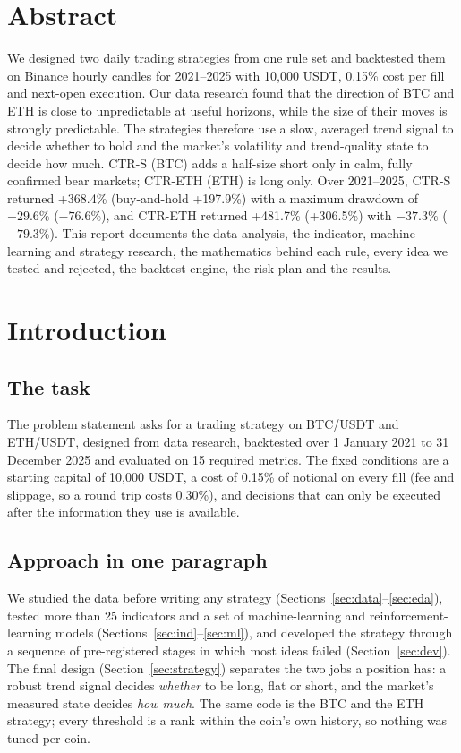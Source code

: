 \documentclass[11pt,a4paper]{article}
\theoremstyle{definition}
\begin{document}
\section*{Abstract}
We designed two daily trading strategies from one rule set and backtested them on Binance hourly candles for 2021--2025 with 10{,}000 USDT, 0.15\% cost per fill and next-open execution.
Our data research found that the direction of BTC and ETH is close to unpredictable at useful horizons, while the size of their moves is strongly predictable.
The strategies therefore use a slow, averaged trend signal to decide whether to hold and the market's volatility and trend-quality state to decide how much.
CTR-S (BTC) adds a half-size short only in calm, fully confirmed bear markets; CTR-ETH (ETH) is long only.
Over 2021--2025, CTR-S returned +368.4\% (buy-and-hold +197.9\%) with a maximum drawdown of $-29.6\%$ ($-76.6\%$), and CTR-ETH returned +481.7\% (+306.5\%) with $-37.3\%$ ($-79.3\%$).
This report documents the data analysis, the indicator, machine-learning and strategy research, the mathematics behind each rule, every idea we tested and rejected, the backtest engine, the risk plan and the results.

\vspace{4mm}
\tableofcontents
\newpage

\section{Introduction}
\subsection{The task}
The problem statement asks for a trading strategy on BTC/USDT and ETH/USDT, designed from data research, backtested over 1 January 2021 to 31 December 2025 and evaluated on 15 required metrics.
The fixed conditions are a starting capital of 10{,}000 USDT, a cost of 0.15\% of notional on every fill (fee and slippage, so a round trip costs 0.30\%), and decisions that can only be executed after the information they use is available.

\subsection{Approach in one paragraph}
We studied the data before writing any strategy (Sections~\ref{sec:data}--\ref{sec:eda}), tested more than 25 indicators and a set of machine-learning and reinforcement-learning models (Sections~\ref{sec:ind}--\ref{sec:ml}), and developed the strategy through a sequence of pre-registered stages in which most ideas failed (Section~\ref{sec:dev}).
The final design (Section~\ref{sec:strategy}) separates the two jobs a position has: a robust trend signal decides \emph{whether} to be long, flat or short, and the market's measured state decides \emph{how much}.
The same code is the BTC and the ETH strategy; every threshold is a rank within the coin's own history, so nothing was tuned per coin.
\end{document}
